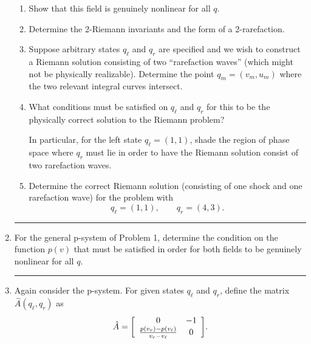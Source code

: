 \documentclass[11pt]{article}
\newenvironment{mat}{\left[ \begin{array}{ccccccccccccc}}{\end{array}\right]}
\newcommand\bcm{\begin{mat}}
\newcommand\ecm{\end{mat}}
\begin{document}
\begin{enumerate}
\begin{enumerate}
\item Show that this field is genuinely nonlinear for all $q$.

\item Determine the 2-Riemann invariants and the form of a 2-rarefaction.

\item Suppose arbitrary states $q_\ell$ and $q_r$ are specified and we wish to
construct a Riemann solution consisting of two ``rarefaction waves'' (which
might not be physically realizable).   Determine the point $q_m =
(v_m,u_m)$ where the two relevant integral curves intersect.

\item What conditions must be satisfied on $q_\ell$ and $q_r$ for this to be
the physically correct solution to the Riemann problem?

In particular, for the left state $q_\ell = (1,1)$, 
shade the region of phase space where $q_r$ must lie in order to have the
Riemann solution consist of two rarefaction waves.


\item Determine the correct Riemann solution (consisting of one shock and
one rarefaction wave) for  the problem with
\[
q_\ell = (1,1), \qquad q_r = (4,3).
\]

\end{enumerate}



\vskip 1cm
\hrule
\item
For the general p-system of Problem 1,
determine the condition on the function $p(v)$
that must be satisfied in order for both fields to be genuinely nonlinear
for all $q$.




\vskip 1cm
\hrule
\item
Again consider the p-system.  For given states $q_\ell$ and $q_r$, 
define the matrix $\hat A(q_\ell,q_r)$ as
\[
\hat A = \bcm 0&-1\\ \frac{p(v_r)-p(v_\ell)}{v_r - v_\ell} & 0\ecm.
\]


\end{enumerate}
\end{document}
